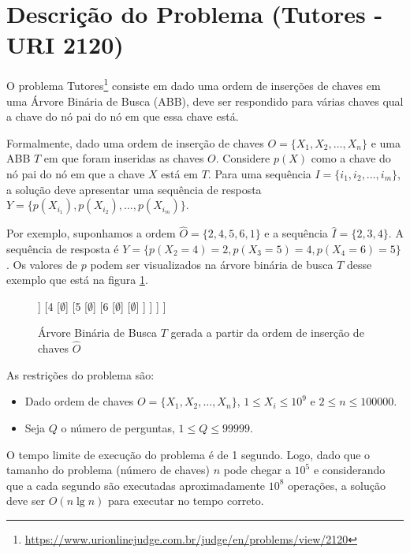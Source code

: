 \section{Descrição do Problema (Tutores - URI 2120)} \label{sec:tutores}

O problema Tutores\footnote{\url{https://www.urionlinejudge.com.br/judge/en/problems/view/2120}}
consiste em dado uma ordem de inserções de chaves em uma Árvore
Binária de Busca (ABB), deve ser respondido para várias chaves qual a chave do nó
pai do nó em que essa chave está.

Formalmente, dado uma ordem de inserção de chaves $O = \{X_1, X_2, \ldots, X_n\}$ e
uma ABB $T$ em que foram inseridas as chaves $O$. Considere $p(X)$ como a chave
do nó pai do nó em que a chave $X$ está em $T$. Para uma sequência $I = \{i_1, i_2, \ldots, i_m\}$,
a solução deve apresentar uma sequência de resposta $Y = \{p(X_{i_1}), p(X_{i_2}), \ldots, p(X_{i_m})\}$.

Por exemplo, suponhamos a ordem $\hat{O} = \{2, 4, 5, 6, 1\}$ e a sequência $\hat{I} = \{2, 3, 4\}$.
A sequência de resposta é $Y = \{p(X_2 = 4) = 2, p(X_3 = 5) = 4, p(X_4 = 6) = 5\}$. Os valores
de $p$ podem ser visualizados na árvore binária de busca $T$ desse exemplo que 
está na figura \ref{fig:abb_exemplo}.

\begin{figure}[!htb]
\centering
\begin{forest}
[2
	[1
		[$\emptyset$]
		[$\emptyset$]
	]
	[4
		[$\emptyset$]
		[5
			[$\emptyset$]
			[6
				[$\emptyset$]
				[$\emptyset$]
			]
		]
	]
]
\end{forest}
\caption{Árvore Binária de Busca $T$ gerada a partir da ordem de inserção de chaves $\hat{O}$}
\label{fig:abb_exemplo}
\end{figure}

As restrições do problema são:
\begin{itemize}
\item Dado ordem de chaves $O = \{X_1, X_2, \ldots, X_n\}$, $1 \leq X_i \leq 10^9$ e $2 \leq n \leq 100000$.
\item Seja $Q$ o número de perguntas, $1 \leq Q \leq 99999$.
\end{itemize}

O tempo limite de execução do problema é de 1 segundo. Logo, dado que o tamanho do problema (número de chaves) $n$ pode chegar a $10^5$ e considerando que a cada segundo são executadas aproximadamente $10^8$ operações, a solução deve ser $O(n \lg n)$ para executar no tempo correto.